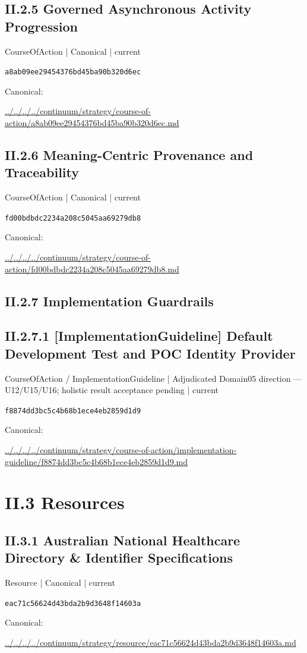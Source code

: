 \documentclass[10pt,a4paper]{article}
\begin{document}
\subsection*{II.2.5 Governed Asynchronous Activity Progression}
\label{element-a8ab09ee29454376bd45ba90b320d6ec}
{\small CourseOfAction | Canonical | current}\par
\texttt{a8ab09ee29454376bd45ba90b320d6ec}\par
Canonical: \par
{\footnotesize\url{../../../../continuum/strategy/course-of-action/a8ab09ee29454376bd45ba90b320d6ec.md}}\par
\subsection*{II.2.6 Meaning-Centric Provenance and Traceability}
\label{element-fd00bdbdc2234a208c5045aa69279db8}
{\small CourseOfAction | Canonical | current}\par
\texttt{fd00bdbdc2234a208c5045aa69279db8}\par
Canonical: \par
{\footnotesize\url{../../../../continuum/strategy/course-of-action/fd00bdbdc2234a208c5045aa69279db8.md}}\par
\subsection*{II.2.7 Implementation Guardrails}
\subsection*{II.2.7.1 [ImplementationGuideline] Default Development Test and POC Identity Provider}
\label{element-f8874dd3bc5c4b68b1ece4eb2859d1d9}
{\small CourseOfAction / ImplementationGuideline | Adjudicated Domain05 direction — U12/U15/U16; holistic result acceptance pending | current}\par
\texttt{f8874dd3bc5c4b68b1ece4eb2859d1d9}\par
Canonical: \par
{\footnotesize\url{../../../../continuum/strategy/course-of-action/implementation-guideline/f8874dd3bc5c4b68b1ece4eb2859d1d9.md}}\par
\section*{II.3 Resources}
\subsection*{II.3.1 Australian National Healthcare Directory \& Identifier Specifications}
\label{element-eac71c56624d43bda2b9d3648f14603a}
{\small Resource | Canonical | current}\par
\texttt{eac71c56624d43bda2b9d3648f14603a}\par
Canonical: \par
{\footnotesize\url{../../../../continuum/strategy/resource/eac71c56624d43bda2b9d3648f14603a.md}}\par
\end{document}
